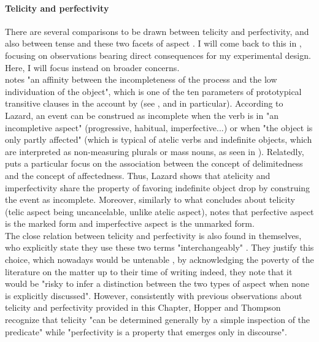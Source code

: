 \paragraph{Telicity and perfectivity}
There are several comparisons to be drawn between telicity and perfectivity, and also between tense and these two facets of aspect \parencite[394-397]{YousefiMardian2019}. I will come back to this in , focusing on observations bearing direct consequences for my experimental design. Here, I will focus instead on broader concerns.\\
\textcite[162]{Lazard2002} notes "an affinity between the incompleteness of the process and the low individuation of the object", which is one of the ten parameters of prototypical transitive clauses in the account by \textcite{HopperThompson1980} (see , and  in particular). According to Lazard, an event can be construed as incomplete when the verb is in "an incompletive aspect" (progressive, habitual, imperfective...) or when "the object is only partly affected" (which is typical of atelic verbs and indefinite objects, which are interpreted as non-measuring plurals or mass nouns, as seen in ). Relatedly, \textcite[118]{Naess2007} puts a particular focus on the association between the concept of delimitedness and the concept of affectedness. Thus, Lazard shows that atelicity and imperfectivity share the property of favoring indefinite object drop by construing the event as incomplete. Moreover, similarly to what \textcite{Olsen1997} concludes about telicity (telic aspect being uncancelable, unlike atelic aspect), \textcite{Dvorak2017thesis} notes that perfective aspect is the marked form and imperfective aspect is the unmarked form.\\
The close relation between telicity and perfectivity is also found in \textcite{HopperThompson1980} themselves, who explicitly state they use these two terms "interchangeably" \parencite[270]{HopperThompson1980}. They justify this choice, which nowadays would be untenable \parencite{bertinetto2001frequent, bertinetto-delfitto2000aspect, CivardiBertinetto2015semantics}, by acknowledging the poverty of the literature on the matter up to their time of writing \textemdash indeed, they note that it would be "risky to infer a distinction between the two types of aspect when none is explicitly discussed". However, consistently with previous observations about telicity and perfectivity provided in this Chapter, Hopper and Thompson recognize that telicity "can be determined generally by a simple inspection of the predicate" while "perfectivity is a property that emerges only in discourse".

